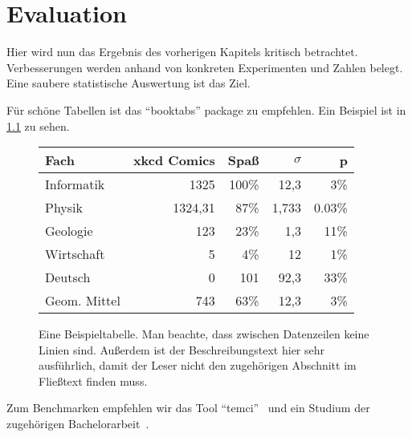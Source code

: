 \chapter{Evaluation}\label{sec:eval}

Hier wird nun das Ergebnis des vorherigen Kapitels kritisch betrachtet.
Verbesserungen werden anhand von konkreten Experimenten und Zahlen belegt.
Eine saubere statistische Auswertung ist das Ziel.

Für schöne Tabellen ist das \enquote{booktabs} package zu empfehlen.
Ein Beispiel ist in \cref{fig:example_table} zu sehen.

\begin{figure}[hb]
\begin{center}
\begin{tabular}{lrrrr}
\toprule
Fach & xkcd Comics & Spaß & $\sigma$ & p \\
\midrule
Informatik & 1325 &  100\% & 12,3 & 3\% \\
Physik     & 1324,31 &  87\%& 1,733 & 0.03\%  \\
Geologie & 123 & 23\% & 1,3 & 11\% \\
Wirtschaft & 5 & 4\% & 12 & 1\% \\
Deutsch & 0 & 101 & 92,3 & 33\% \\
\midrule
Geom. Mittel & 743 & 63\% & 12,3 & 3\% \\
\bottomrule
\end{tabular}
\end{center}
\caption{Eine Beispieltabelle.
Man beachte, dass zwischen Datenzeilen keine Linien sind.
Außerdem ist der Beschreibungstext hier sehr ausführlich,
damit der Leser nicht den zugehörigen Abschnitt im Fließtext finden muss.
}
\label{fig:example_table}
\end{figure}

Zum Benchmarken empfehlen wir das Tool \enquote{temci}~\cite{temci} und ein Studium der zugehörigen Bachelorarbeit~\cite{bechberger16bachelorarbeit}.
